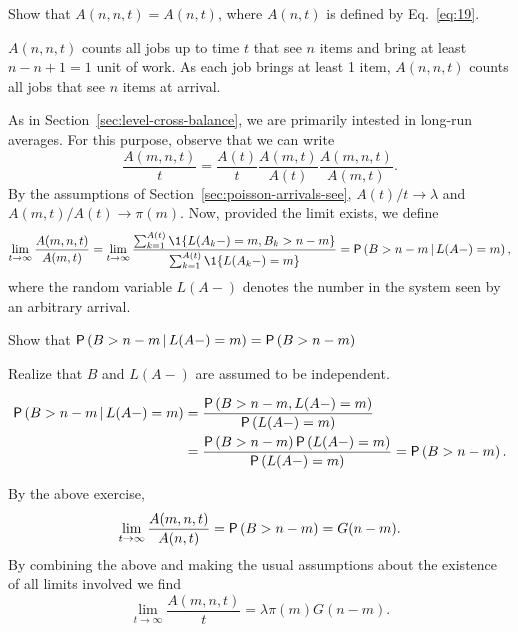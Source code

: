 \begin{exercise}
   Show that $A(n, n,t) = A(n,t)$, where $A(n,t)$ is defined by Eq.~\ref{eq:19}.
\begin{solution}
 $A(n,n,t)$ counts all jobs up to time $t$ that see $n$ items
    and bring at least $n-n+1=1$ unit of work. As each job brings at
    least 1 item, $A(n,n,t)$ counts all jobs that see $n$ items at
    arrival.
\end{solution}
\end{exercise}

As in Section~\ref{sec:level-cross-balance}, we are primarily intested in  long-run averages. For this purpose, observe that we can write
\begin{equation}\label{eq:16}
  \frac{A(m,n,t)}t =   \frac{A(t)}t \frac{A(m,t)}{A(t)}\frac{A(m,n,t)}{A(m,t)}.
\end{equation}
By the assumptions of Section~\ref{sec:poisson-arrivals-see},  $A(t)/t\to\lambda$ and $A(m,t)/A(t)\to\pi(m)$.  Now, provided the limit exists, we define
\begin{equation}\label{eq:1332}
\lim_{t\to\infty} \frac{A(m,n,t)}{A(m,t)} = 
\lim_{t\to\infty} \frac{\sum_{k=1}^{A(t)}\1{L(A_k-) = m, B_k > n-m}}
{\sum_{k=1}^{A(t)}\1{L(A_k-) = m}}=\P{B>n-m\given L(A-)=m},
\end{equation}
where the random variable $L(A-)$   denotes the number in the system seen by an arbitrary arrival.

\begin{exercise}
Show that $\P{B>n-m\given L(A-)=m}=\P{B>n-m}$
\begin{solution}
  \begin{hint}
    Realize that $B$ and $L(A-)$ are assumed to be independent.
  \end{hint}
\begin{equation*}
  \begin{split}
\P{B>n-m\given L(A-)=m} &=
\frac{\P{B>n-m,L(A-)=m}}{\P{L(A-)=m}}\\
&=\frac{\P{B>n-m}\P{L(A-)=m}}{\P{L(A-)=m}} = \P{B>n-m}.
  \end{split}
\end{equation*}
\end{solution}
\end{exercise}

By the above exercise,
\begin{equation*}
\lim_{t\to\infty} \frac{A(m,n,t)}{A(n,t)} = \P{B>n-m} = G(n-m).
\end{equation*} 
By combining the above and making the usual assumptions about the
existence of all limits involved we find
\begin{equation*}
\lim_{t\to\infty}   \frac{A(m,n,t)}t = \lambda \pi(m) G(n-m).
\end{equation*}


